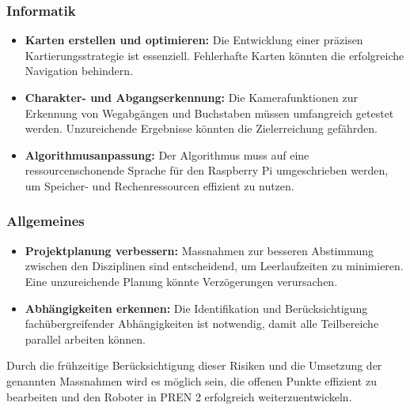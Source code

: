 \documentclass[main.tex]{subfiles} %
\begin{document}
\subsubsection*{Informatik}  
\begin{itemize}  
    \item \textbf{Karten erstellen und optimieren:}  
    Die Entwicklung einer präzisen Kartierungsstrategie  
    ist essenziell. Fehlerhafte Karten könnten die erfolgreiche Navigation behindern.  
    \item \textbf{Charakter- und Abgangserkennung:}  
    Die Kamerafunktionen zur Erkennung von Wegabgängen und Buchstaben müssen  
    umfangreich getestet werden. Unzureichende Ergebnisse könnten die  
    Zielerreichung gefährden.  
    \item \textbf{Algorithmusanpassung:}  
    Der Algorithmus muss auf eine ressourcenschonende Sprache für den Raspberry Pi  
    umgeschrieben werden, um Speicher- und Rechenressourcen effizient zu nutzen.
\end{itemize}  

\subsubsection*{Allgemeines}  
\begin{itemize}  
    \item \textbf{Projektplanung verbessern:}  
    Massnahmen zur besseren Abstimmung zwischen den Disziplinen sind entscheidend,  
    um Leerlaufzeiten zu minimieren. Eine unzureichende Planung könnte Verzögerungen  
    verursachen.  
    \item \textbf{Abhängigkeiten erkennen:}  
    Die Identifikation und Berücksichtigung fachübergreifender Abhängigkeiten ist  
    notwendig, damit alle Teilbereiche parallel arbeiten können.  
\end{itemize}  

Durch die frühzeitige Berücksichtigung dieser Risiken und die Umsetzung der genannten  
Massnahmen wird es möglich sein, die offenen Punkte effizient zu bearbeiten und den  
Roboter in PREN 2 erfolgreich weiterzuentwickeln.
\end{document}
